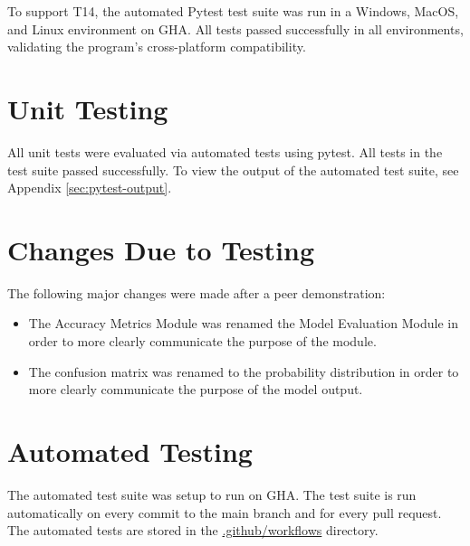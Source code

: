 \documentclass[12pt, titlepage]{article}
\begin{document}
To support T14, the automated Pytest test suite was run in a Windows, MacOS, and
Linux environment on GHA. All tests passed successfully in all environments,
validating the program's cross-platform compatibility.



\section{Unit Testing}

All unit tests were evaluated via automated tests using pytest. All tests in the
test suite passed successfully. To view the output of the automated test
suite, see Appendix \ref{sec:pytest-output}.

\section{Changes Due to Testing}

The following major changes were made after a peer demonstration:

\begin{itemize}
  \item The Accuracy Metrics Module was renamed the Model Evaluation Module in
  order to more clearly communicate the purpose of the module.
  \item The confusion matrix was renamed to the probability distribution in
  order to more clearly communicate the purpose of the model output.
\end{itemize}


\section{Automated Testing}

The automated test suite was setup to run on GHA. The test suite is run
automatically on every commit to the main branch and for every pull request. The
automated tests are stored in the \href{https://github.com/ptrandev/OCRacle/tree/main/.github/workflows}{.github/workflows} directory.
\end{document}
